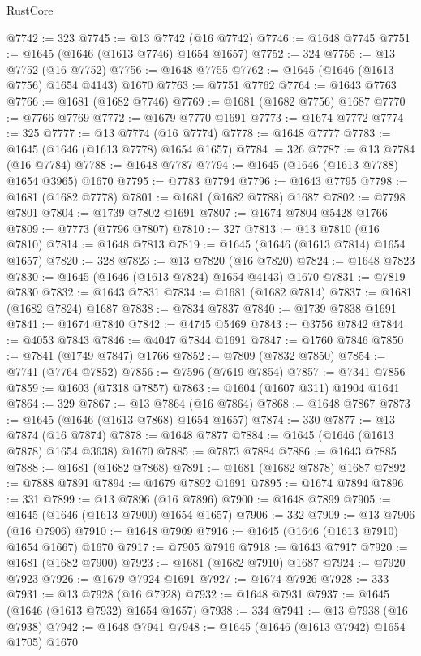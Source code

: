 \begin{lexlean}{RustCore}
\begin{coremodule}
@7742 := 323
@7745 := @13 @7742 (@16 @7742)
@7746 := @1648 @7745
@7751 := @1645 (@1646 (@1613 @7746) @1654 @1657)
@7752 := 324
@7755 := @13 @7752 (@16 @7752)
@7756 := @1648 @7755
@7762 := @1645 (@1646 (@1613 @7756) @1654 @4143) @1670
@7763 := @7751 @7762
@7764 := @1643 @7763
@7766 := @1681 (@1682 @7746)
@7769 := @1681 (@1682 @7756) @1687
@7770 := @7766 @7769
@7772 := @1679 @7770 @1691
@7773 := @1674 @7772
@7774 := 325
@7777 := @13 @7774 (@16 @7774)
@7778 := @1648 @7777
@7783 := @1645 (@1646 (@1613 @7778) @1654 @1657)
@7784 := 326
@7787 := @13 @7784 (@16 @7784)
@7788 := @1648 @7787
@7794 := @1645 (@1646 (@1613 @7788) @1654 @3965) @1670
@7795 := @7783 @7794
@7796 := @1643 @7795
@7798 := @1681 (@1682 @7778)
@7801 := @1681 (@1682 @7788) @1687
@7802 := @7798 @7801
@7804 := @1739 @7802 @1691
@7807 := @1674 @7804 @5428 @1766
@7809 := @7773 (@7796 @7807)
@7810 := 327
@7813 := @13 @7810 (@16 @7810)
@7814 := @1648 @7813
@7819 := @1645 (@1646 (@1613 @7814) @1654 @1657)
@7820 := 328
@7823 := @13 @7820 (@16 @7820)
@7824 := @1648 @7823
@7830 := @1645 (@1646 (@1613 @7824) @1654 @4143) @1670
@7831 := @7819 @7830
@7832 := @1643 @7831
@7834 := @1681 (@1682 @7814)
@7837 := @1681 (@1682 @7824) @1687
@7838 := @7834 @7837
@7840 := @1739 @7838 @1691
@7841 := @1674 @7840
@7842 := @4745 @5469
@7843 := @3756 @7842
@7844 := @4053 @7843
@7846 := @4047 @7844 @1691
@7847 := @1760 @7846
@7850 := @7841 (@1749 @7847) @1766
@7852 := @7809 (@7832 @7850)
@7854 := @7741 (@7764 @7852)
@7856 := @7596 (@7619 @7854)
@7857 := @7341 @7856
@7859 := @1603 (@7318 @7857)
@7863 := @1604 (@1607 @311) @1904 @1641
@7864 := 329
@7867 := @13 @7864 (@16 @7864)
@7868 := @1648 @7867
@7873 := @1645 (@1646 (@1613 @7868) @1654 @1657)
@7874 := 330
@7877 := @13 @7874 (@16 @7874)
@7878 := @1648 @7877
@7884 := @1645 (@1646 (@1613 @7878) @1654 @3638) @1670
@7885 := @7873 @7884
@7886 := @1643 @7885
@7888 := @1681 (@1682 @7868)
@7891 := @1681 (@1682 @7878) @1687
@7892 := @7888 @7891
@7894 := @1679 @7892 @1691
@7895 := @1674 @7894
@7896 := 331
@7899 := @13 @7896 (@16 @7896)
@7900 := @1648 @7899
@7905 := @1645 (@1646 (@1613 @7900) @1654 @1657)
@7906 := 332
@7909 := @13 @7906 (@16 @7906)
@7910 := @1648 @7909
@7916 := @1645 (@1646 (@1613 @7910) @1654 @1667) @1670
@7917 := @7905 @7916
@7918 := @1643 @7917
@7920 := @1681 (@1682 @7900)
@7923 := @1681 (@1682 @7910) @1687
@7924 := @7920 @7923
@7926 := @1679 @7924 @1691
@7927 := @1674 @7926
@7928 := 333
@7931 := @13 @7928 (@16 @7928)
@7932 := @1648 @7931
@7937 := @1645 (@1646 (@1613 @7932) @1654 @1657)
@7938 := 334
@7941 := @13 @7938 (@16 @7938)
@7942 := @1648 @7941
@7948 := @1645 (@1646 (@1613 @7942) @1654 @1705) @1670

\end{coremodule}
\end{lexlean}
